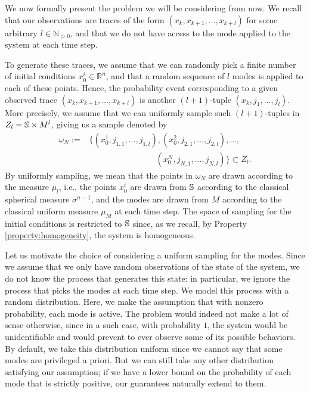 We now formally present the problem we will be considering from now. We recall that our observations are traces of the form $(x_k,x_{k+1},\dots,x_{k+l})$ for some arbitrary $l \in \mathbb{N}_{>0}$, and that we do not have access to the mode applied to the system at each time step. 

To generate these traces, we assume that we can randomly pick a finite number of initial conditions $x_0^i \in \mathbb{R}^n$, and that a random sequence of $l$ modes is applied to each of these points. Hence, the probability event corresponding to a given observed trace $(x_k,x_{k+1},\dots,x_{k+l})$ is another $(l+1)$-tuple $(x_k,j_1,\dots,j_l)$. More precisely, we assume that we can uniformly sample such $(l+1)$-tuples in $Z_l = \mathbb{S} \times M^l$, giving us a sample denoted by 
\begin{equation*}
\begin{aligned}
\omega_N := & \{(x_0^1, j_{1,1}, \dots, j_{1,l}), (x_0^2, j_{2,1}, \dots, j_{2,l}), \ldots,\\
           & \qquad \qquad \qquad \qquad (x_0^N, j_{N,1},\dots, j_{N,l})\} \subset Z_l.
\end{aligned}
\end{equation*}
By uniformly sampling, we mean that the points in $\omega_N$ are drawn according to the measure $\mu_l$, i.e., the points $x_0^i$ are drawn from $\mathbb{S}$ according to the classical spherical measure $\sigma^{n-1}$, and the modes are drawn from $M$ according to the classical uniform measure $\mu_M$ at each time step. The space of sampling for the initial conditions is restricted to $\mathbb{S}$ since, as we recall, by Property \ref{property:homogeneity}, the system is homogeneous. 
\begin{rem}
Let us motivate the choice of considering a uniform sampling for the modes. Since we assume that we only have random observations of the state of the system, we do not know the process that generates this state: in particular, we ignore the process that picks the modes at each time step. We model this process with a random distribution. Here, we make the assumption that with nonzero probability, each mode is active. The problem would indeed not make a lot of sense otherwise, since in a such case, with probability $1$, the system would be unidentifiable and would prevent to ever observe some of its possible behaviors. By default, we take this distribution uniform since we cannot say that some modes are privileged a priori. But we can still take any other distribution satisfying our assumption; if we have a lower bound on the probability of each mode that is strictly positive, our guarantees naturally extend to them.
\end{rem}
